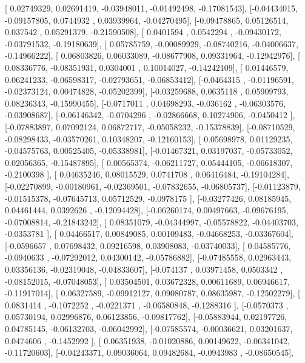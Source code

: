 \documentclass{article}
\begin{document}
       [ 0.02749329,  0.02691419, -0.03948011, -0.01492498, -0.17081543],
       [-0.04434015, -0.09157805,  0.0744932 ,  0.03939964, -0.04270495],
       [-0.09478865,  0.05126514,  0.037542  ,  0.05291379, -0.21590508],
       [ 0.0401594 ,  0.0542294 , -0.09430172, -0.03791532, -0.19180639],
       [ 0.05785759, -0.00089929, -0.08740216, -0.04006637, -0.14966222],
       [ 0.06803826,  0.06033089, -0.08677908,  0.09331964, -0.12942976],
       [ 0.08336776, -0.08351931,  0.0304001 ,  0.10014027, -0.14242109],
       [ 0.01446579,  0.06241233, -0.06598317, -0.02793651, -0.06853412],
       [-0.0464315 , -0.01196591, -0.02373124,  0.00474828, -0.05202399],
       [-0.03259688,  0.0635118 ,  0.05909793,  0.08236343, -0.15990455],
       [-0.0717011 ,  0.04698293, -0.036162  , -0.06303576, -0.03908687],
       [-0.06146342, -0.0704296 , -0.02866668,  0.10274906, -0.0450412 ],
       [-0.07883897,  0.07092124,  0.06872717, -0.05058232, -0.15378839],
       [-0.08710529, -0.08298433, -0.03570261,  0.10348207, -0.12160153],
       [ 0.05698978,  0.01129235, -0.04575763,  0.00525405, -0.05338981],
       [-0.01467321,  0.03197037, -0.05733052,  0.02056365, -0.15487895],
       [ 0.00565374, -0.06211727,  0.05444105, -0.06618307, -0.2100398 ],
       [ 0.04635246,  0.08015529,  0.0741708 ,  0.06416484, -0.19104284],
       [-0.02270899, -0.00180961, -0.02369501, -0.07832655, -0.06805737],
       [-0.01123879, -0.01515378, -0.07645713,  0.05712529, -0.0978175 ],
       [-0.03277426,  0.08185945,  0.04461444,  0.0392626 , -0.12094428],
       [-0.06260174,  0.00497663, -0.09676195, -0.07008814, -0.21843242],
       [ 0.08351079, -0.04344997, -0.05578822, -0.04403703, -0.0353781 ],
       [ 0.04466517,  0.00849085,  0.00109483, -0.04668253, -0.03367604],
       [-0.0596657 ,  0.07698432,  0.09216598,  0.03908083, -0.03740033],
       [ 0.04585776, -0.0940633 , -0.07292012,  0.04300142, -0.05786882],
       [-0.07485558,  0.02963443,  0.03356136, -0.02319048, -0.04833607],
       [-0.074137  ,  0.03971458,  0.0503342 , -0.08152015, -0.07048053],
       [ 0.03504501,  0.03672328,  0.00611689,  0.06946617, -0.11917014],
       [ 0.06327589, -0.09912127,  0.09080787,  0.08635987, -0.12502279],
       [ 0.0831414 , -0.1072252 , -0.0221371 , -0.06580848, -0.1288316 ],
       [-0.0570373 ,  0.05730194,  0.02996876,  0.06123856, -0.09817762],
       [-0.05883944,  0.02197726,  0.04785145, -0.06132703, -0.06042992],
       [-0.07585574, -0.00036621,  0.03201637,  0.0474606 , -0.1452992 ],
       [ 0.06351938, -0.01020886,  0.00149622, -0.06341042, -0.11720603],
       [-0.04243371,  0.09036064,  0.09482684, -0.0943983 , -0.08650545],
\end{document}
